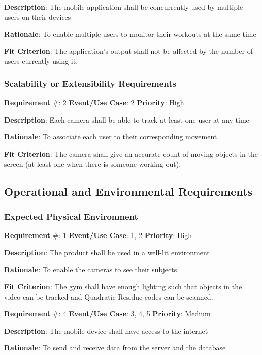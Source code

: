 \documentclass{article}
\newcommand\tab{\hspace*{2cm}}
\begin{document}
\textbf{Description}: The mobile application shall be concurrently used by multiple users on their devices

\textbf{Rationale}: To enable multiple users to monitor their workouts at the same time

\textbf{Fit Criterion}: The application's output shall not be affected by the number of users currently using it.

\medskip

\subsubsection{Scalability or Extensibility Requirements}
\textbf{Requirement} \#: 2 \tab \textbf{Event/Use Case}: 2 \tab \textbf{Priority}: High

\textbf{Description}: Each camera shall be able to track at least one user at any time

\textbf{Rationale}: To associate each user to their corresponding movement

\textbf{Fit Criterion}: The camera shall give an accurate count of moving objects in the screen (at least one when there is someone working out).

\medskip

\subsection{Operational and Environmental Requirements}
\subsubsection{Expected Physical Environment}
\textbf{Requirement} \#: 1 \tab \textbf{Event/Use Case}: 1, 2 \tab \textbf{Priority}: High

\textbf{Description}: The product shall be used in a well-lit environment

\textbf{Rationale}: To enable the cameras to see their subjects

\textbf{Fit Criterion}: The gym shall have enough lighting such that objects in the video can be tracked and Quadratic Residue codes can be scanned.

\medskip

\textbf{Requirement} \#: 4 \tab \textbf{Event/Use Case}: 3, 4, 5 \tab \textbf{Priority}: Medium

\textbf{Description}: The mobile device shall have access to the internet
 
\textbf{Rationale}: To send and receive data from the server and the database
\end{document}
